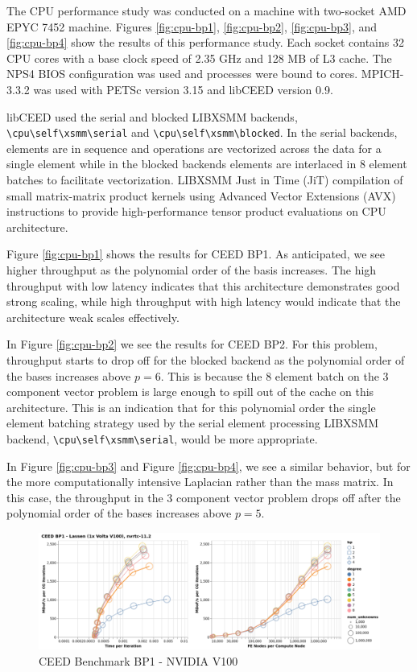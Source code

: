 The CPU performance study was conducted on a machine with two-socket AMD EPYC 7452 machine.
Figures \ref{fig:cpu-bp1}, \ref{fig:cpu-bp2}, \ref{fig:cpu-bp3}, and \ref{fig:cpu-bp4} show the results of this performance study.
Each socket contains 32 CPU cores with a base clock speed of 2.35 GHz and 128 MB of L3 cache.
The NPS4 BIOS configuration was used and processes were bound to cores.
MPICH-3.3.2 was used with PETSc \cite{petsc-user-ref} version 3.15 and libCEED \cite{libceed} version 0.9.

libCEED used the serial and blocked LIBXSMM \cite{libxsmm} backends, \lstinline{\cpu\self\xsmm\serial} and \lstinline{\cpu\self\xsmm\blocked}.
In the serial backends, elements are in sequence and operations are vectorized across the data for a single element while in the blocked backends elements are interlaced in 8 element batches to facilitate vectorization.
LIBXSMM Just in Time (JiT) compilation of small matrix-matrix product kernels using Advanced Vector Extensions (AVX) instructions to provide high-performance tensor product evaluations on CPU architecture.

Figure \ref{fig:cpu-bp1} shows the results for CEED BP1.
As anticipated, we see higher throughput as the polynomial order of the basis increases.
The high throughput with low latency indicates that this architecture demonstrates good strong scaling, while high throughput with high latency would indicate that the architecture weak scales effectively.

In Figure \ref{fig:cpu-bp2} we see the results for CEED BP2.
For this problem, throughput starts to drop off for the blocked backend as the polynomial order of the bases increases above $p = 6$.
This is because the 8 element batch on the 3 component vector problem is large enough to spill out of the cache on this architecture.
This is an indication that for this polynomial order the single element batching strategy used by the serial element processing LIBXSMM backend, \lstinline{\cpu\self\xsmm\serial}, would be more appropriate.

In Figure \ref{fig:cpu-bp3} and Figure \ref{fig:cpu-bp4}, we see a similar behavior, but for the more computationally intensive Laplacian rather than the mass matrix.
In this case, the throughput in the 3 component vector problem drops off after the polynomial order of the bases increases above $p = 5$.

\begin{figure}[ht!]
\includegraphics[width=.99\linewidth]{../img/cudaGenBP1Clip}
\caption{CEED Benchmark BP1 - NVIDIA V100}
\label{fig:gpu-bp1}
\end{figure}

